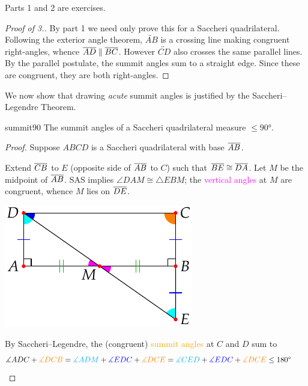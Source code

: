 Parts 1 and 2 are exercises.

\begin{proof}[Proof of 3.]
	By part 1 we need only prove this for a Saccheri quadrilateral.
	Following the exterior angle theorem, $\overleftrightarrow{AB}$ is a crossing line making congruent right-angles, whence $\cl{AD}\parallel\cl{BC}$.\smallbreak
	However $\overleftrightarrow{CD}$ also crosses the same parallel lines. By the parallel postulate, the summit angles sum to a straight edge. Since these are congruent, they are both right-angles. 
\end{proof}

We now show that drawing \emph{acute} summit angles is justified by the Saccheri--Legendre Theorem.

\begin{thm}{}{summit90}
	The summit angles of a Saccheri quadrilateral measure $\le \ang{90}$. 
\end{thm}

\begin{proof}
	Suppose $ABCD$ is a Saccheri quadrilateral with base $\cl{AB}$.\par
	\begin{minipage}[t]{0.65\linewidth}\vspace{-4pt}
		Extend $\cl{CB}$ to $E$ (opposite side of $\cl{AB}$ to $C$) such that $\cl{BE}\cong\cl{DA}$. Let $M$ be the midpoint of $\cl{AB}$.\smallbreak
	SAS implies $\angle DAM\cong \triangle EBM$; the \textcolor{Magenta}{vertical angles} at $M$ are congruent, whence $M$ lies on $\cl{DE}$.
	\end{minipage}
	\hfill
	\begin{minipage}[t]{0.34\linewidth}\vspace{-22pt}
		\flushright\includegraphics[scale=0.9]{history-quad2}\vspace{-5pt}
	\end{minipage}\par
	By Saccheri--Legendre, the (congruent) \textcolor{orange}{summit angles} at $C$ and $D$ sum to
	\[
		\measuredangle ADC +\textcolor{orange}{\measuredangle DCB} =\textcolor{cyan}{\measuredangle ADM} +\textcolor{blue}{\measuredangle EDC} +\textcolor{orange}{\measuredangle DCE} =\textcolor{cyan}{\measuredangle CED} +\textcolor{blue}{\measuredangle EDC} +\textcolor{orange}{\measuredangle DCE} \le \ang{180} \tag*{\qedhere}
	\]
\end{proof}


